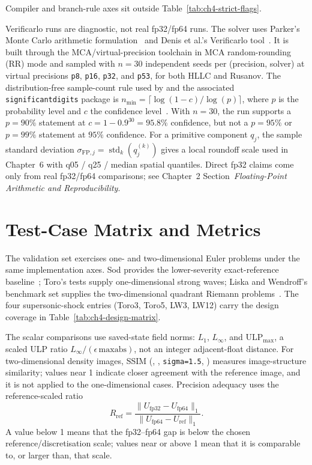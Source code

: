 Compiler and branch-rule axes sit outside Table~\ref{tab:ch4-strict-flags}.

Verificarlo runs are diagnostic, not real fp32/fp64 runs. The solver uses Parker's Monte
Carlo arithmetic formulation~\citep{parker_1997} and Denis et al.'s Verificarlo
tool~\citep{denis_etal_2016}. It is built through the
MCA/virtual-precision toolchain in MCA random-rounding (RR) mode and sampled
with $n = 30$ independent seeds per (precision, solver)
at virtual precisions \texttt{p8}, \texttt{p16}, \texttt{p32}, and \texttt{p53},
for both HLLC and Rusanov. The distribution-free sample-count rule used by
\citet{sohier_etal_2021} and the associated \texttt{significantdigits} package is
\(n_{\min}=\lceil \log(1-c)/\log(p)\rceil\), where \(p\) is the probability
level and \(c\) the confidence level~\citep{significantdigits_package}. With
\(n=30\), the run supports a \(p=90\%\) statement at \(c=1-0.9^{30}=95.8\%\)
confidence, but not a \(p=95\%\) or \(p=99\%\) statement at \(95\%\) confidence.
For a primitive component $q_j$, the sample standard deviation
$\sigma_{\mathrm{FP},j}=\operatorname{std}_k(q_j^{(k)})$ gives a local roundoff
scale used in Chapter~6 with q05 / q25 / median spatial quantiles.
Direct fp32 claims come only from real fp32/fp64 comparisons; see Chapter~2 Section~\emph{Floating-Point Arithmetic and Reproducibility}.

\section{Test-Case Matrix and Metrics}
The validation set exercises one- and two-dimensional Euler problems under the
same implementation axes. Sod provides the lower-severity exact-reference
baseline~\citep{sod_1978}; Toro's tests supply one-dimensional strong waves;
Liska and Wendroff's benchmark set supplies the two-dimensional quadrant
Riemann problems~\citep{toro2009, liska_wendroff_2003}. The four
supersonic-shock entries (Toro3, Toro5, LW3, LW12) carry the design
coverage in Table~\ref{tab:ch4-design-matrix}.

The scalar comparisons use saved-state field norms: \(L_1\),
\(L_\infty\), and \(\mathrm{ULP}_{\max}\), a scaled ULP ratio
\(L_\infty/(\epsilon\,\mathrm{maxabs})\), not an integer
adjacent-float distance. For two-dimensional density images, SSIM
(\texttt{},
\texttt{}, \texttt{sigma=1.5},
\texttt{})
measures image-structure similarity; values near 1 indicate closer agreement
with the reference image, and it is not applied to the one-dimensional cases.
Precision adequacy uses the reference-scaled ratio
\begin{equation}\label{eq:ch4-rref}
R_{\mathrm{ref}} =
\frac{\|U_{\mathrm{fp32}}-U_{\mathrm{fp64}}\|_1}
     {\|U_{\mathrm{fp64}}-U_{\mathrm{ref}}\|_1}.
\end{equation}
A value below 1 means that the fp32--fp64 gap is below the chosen
reference/discretisation scale; values near or above 1 mean that it is
comparable to, or larger than, that scale.

